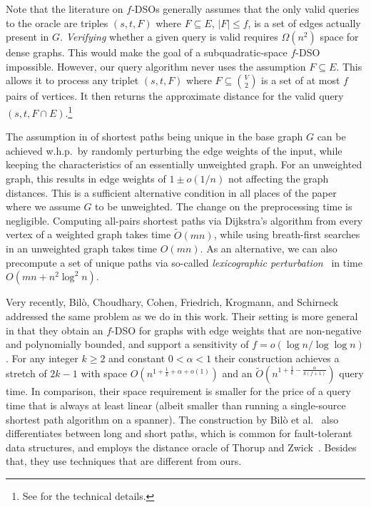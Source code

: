 \documentclass{article}\usepackage[a4paper,margin=20mm]{geometry}
\newcommand*{\Otilde}{\widetilde{O}}
\renewcommand{\le}{\leqslant}
\renewcommand{\ge}{\geqslant}
\begin{document}
Note that the literature on $f$-DSOs generally assumes that the only valid queries
to the oracle are triples $(s,t,F)$ where $F \subseteq E$, $|F| \le f$, is a set of edges
actually present in $G$.
\emph{Verifying} whether a given query is valid requires $\Omega(n^2)$ space for dense graphs.
This would make the goal of a subquadratic-space $f$-DSO impossible.
However, our query algorithm never uses the assumption $F \subseteq E$.
This allows it to process any triplet $(s,t,F)$ 
where $F \subseteq \binom{V}{2}$ is a set of at most $f$ pairs of vertices.
It then returns the approximate distance for the valid query~$(s,t, F \cap E)$.\footnote{
	See  for the technical details.
}

The assumption in  of shortest paths being unique
in the base graph $G$ can be achieved w.h.p.\ by randomly perturbing the edge weights of the input,
while keeping the characteristics of an essentially unweighted graph.
For an unweighted graph, this results in edge weights of $1 \pm o(1/n)$
not affecting the graph distances.
This is a sufficient alternative condition in all places of the paper
where we assume $G$ to be unweighted.
The change on the preprocessing time is negligible.
Computing all-pairs shortest paths via Dijkstra's algorithm from every vertex of a weighted graph
takes time $\Otilde(mn)$, while using breath-first searches 
in an unweighted graph takes time $O(mn)$.
As an alternative,
we can also precompute a set of unique paths via so-called 
\emph{lexicographic perturbation}~\cite{CaChEr13} in time $O(mn + n^2 \log^2 n)$.

Very recently, Bilò, Choudhary, Cohen, Friedrich, Krogmann, and Schirneck~\cite{Bilo23CompactDOLargeSensitivity} addressed the same problem as we do in this work.
Their setting is more general in that they obtain an $f$-DSO for graphs with 
edge weights that are non-negative and polynomially bounded,
and support a sensitivity of $f = o(\log n/\log\log n)$.
For any integer $k \ge 2$ and constant \mbox{$0 < \alpha < 1$}
their construction achieves a stretch of $2k-1$ with space $O(n^{1+\frac{1}{k}+\alpha+o(1)})$
and an $\Otilde(n^{1+\frac{1}{k}-\frac{\alpha}{k(f+1)}})$ query time.
In comparison, their space requirement is smaller for the price of a query time that is always
at least linear (albeit smaller than running a single-source shortest path algorithm on a spanner).
The construction by Bilò et al.~\cite{Bilo23CompactDOLargeSensitivity} also differentiates between long and short paths, which is common for fault-tolerant data structures, 
and employs the distance oracle of Thorup and Zwick~\cite{ThorupZ05}.
Besides that, they use techniques that are different from ours.
\end{document}
